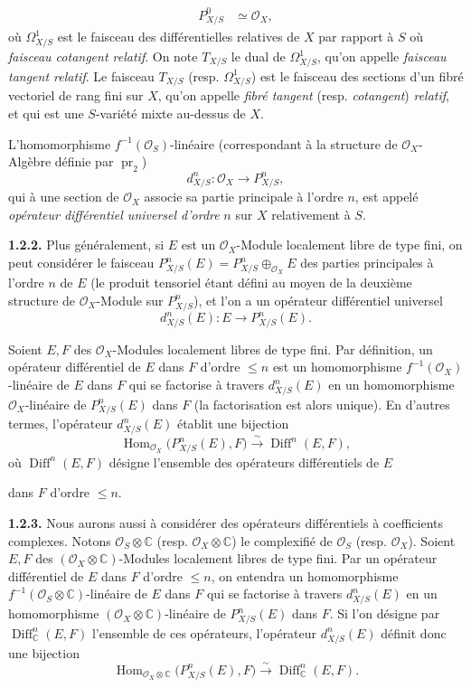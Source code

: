 \documentclass[11pt]{article}
\providecommand{\cO}{\mathcal O}\providecommand{\R}{\mathbb R}\providecommand{\N}{\mathbb N}
\providecommand{\Diff}{\operatorname{Diff}}\providecommand{\Homop}{\operatorname{Hom}}
\providecommand{\pr}{\operatorname{pr}}
\begin{document}
\[
  \begin{aligned}
  P^0_{X/S}&\simeq\cO_X,
  \end{aligned}
\]
où $\Omega^1_{X/S}$ est le faisceau des différentielles relatives de $X$ par rapport à $S$ où \emph{faisceau cotangent relatif}. On note $T_{X/S}$ le dual de $\Omega^1_{X/S}$, qu'on appelle \emph{faisceau tangent relatif}. Le faisceau $T_{X/S}$ (resp. $\Omega^1_{X/S}$) est le faisceau des sections d'un fibré vectoriel de rang fini sur $X$, qu'on appelle \emph{fibré tangent} (resp. \emph{cotangent}) \emph{relatif}, et qui est une $S$-variété mixte au-dessus de $X$.

L'homomorphisme $f^{-1}(\cO_S)$-linéaire (correspondant à la structure de $\cO_X$-Algèbre définie par $\pr_2$)
\[
  d^n_{X/S}:\cO_X\longrightarrow P^n_{X/S},
\]
qui à une section de $\cO_X$ associe sa partie principale à l'ordre $n$, est appelé \emph{opérateur différentiel universel d'ordre} $n$ sur $X$ relativement à $S$.

\textbf{1.2.2.} Plus généralement, si $E$ est un $\cO_X$-Module localement libre de type fini, on peut considérer le faisceau $P^n_{X/S}(E)=P^n_{X/S}\oplus_{\cO_X}E$ des parties principales à l'ordre $n$ de $E$ (le produit tensoriel étant défini au moyen de la deuxième structure de $\cO_X$-Module sur $P^n_{X/S}$), et l'on a un opérateur différentiel universel
\[
  d^n_{X/S}(E):E\longrightarrow P^n_{X/S}(E).
\]

Soient $E,F$ des $\cO_X$-Modules localement libres de type fini. Par définition, un opérateur différentiel de $E$ dans $F$ d'ordre $\le n$ est un homomorphisme $f^{-1}(\cO_X)$-linéaire de $E$ dans $F$ qui se factorise à travers $d^n_{X/S}(E)$ en un homomorphisme $\cO_X$-linéaire de $P^n_{X/S}(E)$ dans $F$ (la factorisation est alors unique). En d'autres termes, l'opérateur $d^n_{X/S}(E)$ établit une bijection
\begin{equation}\tag{1.2.2.1}
  \Homop_{\cO_X}\bigl(P^n_{X/S}(E),F\bigr)
  \xrightarrow{\sim}
  \Diff^n(E,F),
\end{equation}
où $\Diff^n(E,F)$ désigne l'ensemble des opérateurs différentiels de $E$

dans $F$ d'ordre $\le n$.

\textbf{1.2.3.} Nous aurons aussi à considérer des opérateurs différentiels à coefficients complexes. Notons $\cO_S\otimes\mathbb C$ (resp. $\cO_X\otimes\mathbb C$) le complexifié de $\cO_S$ (resp. $\cO_X$). Soient $E,F$ des $(\cO_X\otimes\mathbb C)$-Modules localement libres de type fini. Par un opérateur différentiel de $E$ dans $F$ d'ordre $\le n$, on entendra un homomorphisme $f^{-1}(\cO_S\otimes\mathbb C)$-linéaire de $E$ dans $F$ qui se factorise à travers $d^n_{X/S}(E)$ en un homomorphisme $(\cO_X\otimes\mathbb C)$-linéaire de $P^n_{X/S}(E)$ dans $F$. Si l'on désigne par $\Diff^n_\mathbb C(E,F)$ l'ensemble de ces opérateurs, l'opérateur $d^n_{X/S}(E)$ définit donc une bijection
\begin{equation}\tag{1.2.3.1}
  \Homop_{\cO_X\otimes\mathbb C}\bigl(P^n_{X/S}(E),F\bigr)
  \xrightarrow{\sim}
  \Diff^n_\mathbb C(E,F).
\end{equation}
\end{document}
